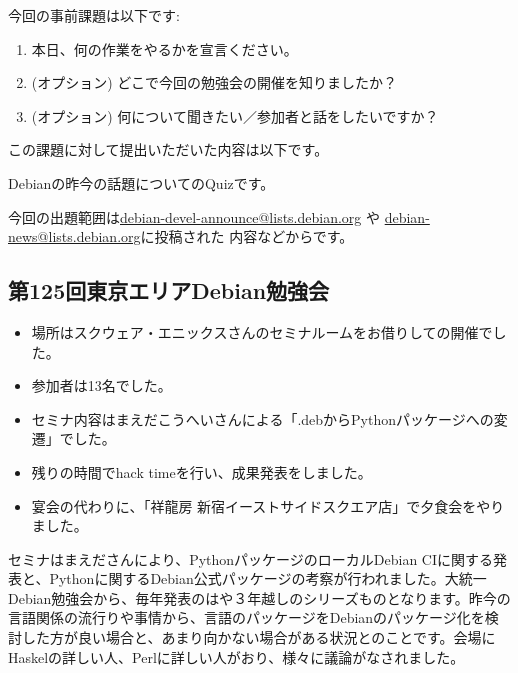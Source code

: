 \documentclass[mingoth,a4paper]{jsarticle}
\begin{document}

今回の事前課題は以下です:
\begin{enumerate}
\item 本日、何の作業をやるかを宣言ください。
\item (オプション) どこで今回の勉強会の開催を知りましたか？
\item (オプション) 何について聞きたい／参加者と話をしたいですか？
\end{enumerate}
この課題に対して提出いただいた内容は以下です。
\begin{multicols}{2}
{\small

}
\end{multicols}


 Debianの昨今の話題についてのQuizです。

今回の出題範囲は\url{debian-devel-announce@lists.debian.org} や \url{debian-news@lists.debian.org}に投稿された
内容などからです。

\begin{multicols}{2}

\end{multicols}


\subsection{第125回東京エリアDebian勉強会}

\begin{itemize}
\item 場所はスクウェア・エニックスさんのセミナルームをお借りしての開催でした。
\item 参加者は13名でした。
\item セミナ内容はまえだこうへいさんによる「.debからPythonパッケージへの変遷」でした。
\item 残りの時間でhack timeを行い、成果発表をしました。
\item 宴会の代わりに、「祥龍房 新宿イーストサイドスクエア店」で夕食会をやりました。
\end{itemize} 

 セミナはまえださんにより、PythonパッケージのローカルDebian CIに関する発表と、Pythonに関するDebian公式パッケージの考察が行われました。大統一Debian勉強会から、毎年発表のはや３年越しのシリーズものとなります。昨今の言語関係の流行りや事情から、言語のパッケージをDebianのパッケージ化を検討した方が良い場合と、あまり向かない場合がある状況とのことです。会場にHaskelの詳しい人、Perlに詳しい人がおり、様々に議論がなされました。
 
\end{document}
